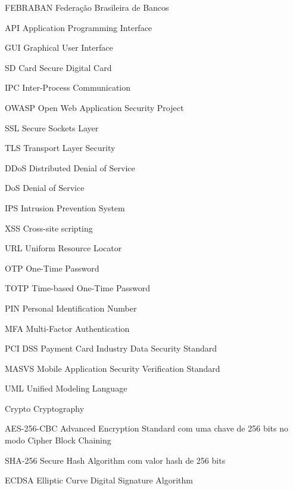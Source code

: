 
\begin{siglas}

\item[FEBRABAN] Federação Brasileira de Bancos
\item[API] Application Programming Interface
\item[GUI] Graphical User Interface
\item[SD Card] Secure Digital Card
\item[IPC] Inter-Process Communication
\item[OWASP] Open Web Application Security Project
\item[SSL] Secure Sockets Layer
\item[TLS] Transport Layer Security
\item[DDoS] Distributed Denial of Service
\item[DoS] Denial of Service
\item[IPS] Intrusion Prevention System
\item[XSS] Cross-site scripting
\item[URL] Uniform Resource Locator
\item[OTP] One-Time Password
\item[TOTP] Time-based One-Time Password
\item[PIN] Personal Identification Number
\item[MFA] Multi-Factor Authentication
\item[PCI DSS] Payment Card Industry Data Security Standard
\item[MASVS] Mobile Application Security Verification Standard
\item[UML] Unified Modeling Language
\item[Crypto] Cryptography 
\item[AES-256-CBC] Advanced Encryption Standard com uma chave de 256 bits no modo Cipher Block Chaining
\item[SHA-256] Secure Hash Algorithm com valor hash de 256 bits
\item[ECDSA] Elliptic Curve Digital Signature Algorithm 


\end{siglas}
